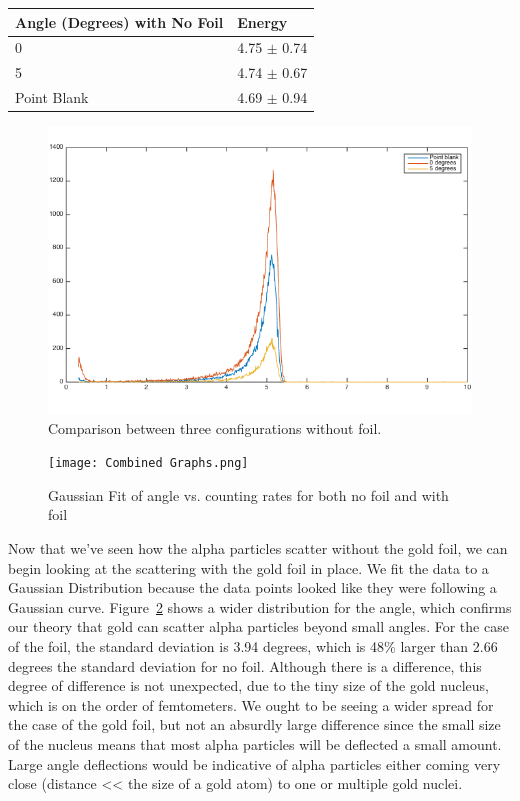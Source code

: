 \begin{table}[h]
\begin{tabular}{|l|l|}
\hline
Angle (Degrees) with No Foil & Energy    \\ \hline \hline
0               & 4.75 $\pm$ 0.74        \\
5               & 4.74 $\pm$ 0.67        \\
Point Blank     & 4.69 $\pm$ 0.94        \\ \hline
\end{tabular}
\label{Energies}
\end{table}

\begin{figure}[h]
  \includegraphics[width = 5 cm]{pointblankcomparison.png}
  \begin{center}
  \caption{Comparison between three configurations without foil.}
  \label{EnergiesGraph}
  \end{center}
\end{figure}


\begin{figure}[t]
  \texttt{[image: Combined Graphs.png]}
  \begin{center}
  \caption{Gaussian Fit of angle vs. counting rates for both no foil and with foil}
  \label{Combined}
  \end{center}
\end{figure}

Now that we've seen how the alpha particles scatter without the gold foil, we can begin looking at the scattering with the gold foil in place. We fit the data to a Gaussian Distribution because the data points looked like they were following a Gaussian curve. Figure~\ref{Combined} shows a wider distribution for the angle, which confirms our theory that gold can scatter alpha particles beyond small angles. For the case of the foil, the standard deviation is 3.94 degrees, which is 48\% larger than 2.66 degrees the standard deviation for no foil. Although there is a difference, this degree of difference is not unexpected, due to the tiny size of the gold nucleus, which is on the order of femtometers. We ought to be seeing a wider spread for the case of the gold foil, but not an absurdly large difference since the small size of the nucleus means that most alpha particles will be deflected a small amount. Large angle deflections would be indicative of alpha particles either coming very close (distance << the size of a gold atom) to one or multiple gold nuclei. 

